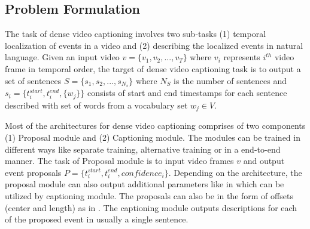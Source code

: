 \subsection{Problem Formulation}
\par The task of dense video captioning involves two sub-tasks (1) temporal localization of events in a video and (2) describing the localized events in natural language. Given an input video $v = \{v_1, v_2, ... , v_T \}$ where $v_i$ represents $i^{th}$ video frame in temporal order, the target of dense video captioning task is to output a set of sentences $S = \{s_1, s_2, ... , s_{N_s}\}$ where $N_S$ is the number of sentences and $s_i = \{t_i^{start}, t_i^{end}, \{w_j\} \}$ consists of start and end timestamps for each sentence described with set of words from a vocabulary set $w_j \in V$.
\par Most of the architectures for dense video captioning comprises of two components (1) Proposal module and (2) Captioning module. The modules can be trained in different ways like separate training, alternative training or in a end-to-end manner. The task of Proposal module is to input video frames $v$ and output event proposals $P = \{t_i^{start}, t_i^{end}, confidence_i \}$. Depending on the architecture, the proposal module can also output additional parameters like in \cite{krishna2017densecaptioning, li2018jointly, wang2018bidirectional} which can be utilized by captioning module. The proposals can also be in the form of offsets (center and length) as in \cite{li2018jointly, iashin2020better, xu2018joint, deng2021sketch, zhou2018end}. The captioning module outputs descriptions for each of the proposed event in usually a single sentence.